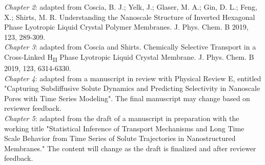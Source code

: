   \noindent\textit{Chapter 2}: adapted from Coscia, B. J.; Yelk, J.; Glaser, M. A.; Gin, D. L.; Feng, X.; Shirts,
  M. R. Understanding the Nanoscale Structure of Inverted Hexagonal Phase Lyotropic Liquid Crystal Polymer
  Membranes. J. Phys. Chem. B 2019, 123, 289-309. \\
    
  \noindent\textit{Chapter 3}: adapted from Coscia and Shirts. Chemically Selective Transport in a Cross-Linked 
  H\textsubscript{II} Phase Lyotropic Liquid Crystal Membrane. J. Phys. Chem. B 2019, 123, 6314-6330. \\
    
  \noindent\textit{Chapter 4}: adapted from a manuscript in review with Physical Review E, entitled 
  "Capturing Subdiffusive Solute Dynamics and Predicting Selectivity in Nanoscale Pores
  with Time Series Modeling". The final manuscript may change based on reviewer feedback. \\
    
  \noindent\textit{Chapter 5}: adapted from the draft of a manuscript in preparation with the working
  title "Statistical Inference of Transport Mechanisms and Long Time Scale Behavior from Time Series 
  of Solute Trajectories in Nanostructured Membranes." The content will change as the
  draft is finalized and after reviewer feedback.
